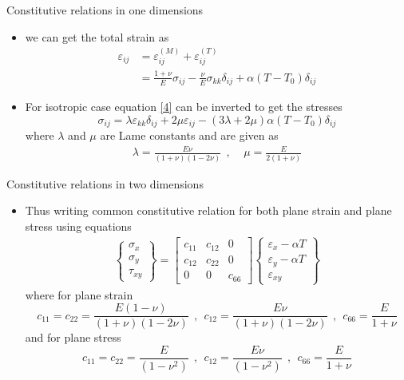 \documentclass{beamer}
\begin{document}
\begin{frame}[t,fragile]{Constitutive relations in one dimensions}
    \begin{itemize}
        \item we can get the total strain as 
\begin{align}
    \varepsilon_{ij}&=\varepsilon_{ij}^{(M)}+\varepsilon_{ij}^{(T)}\nonumber \\
    &=\frac{1+\nu}{E}\sigma_{ij}-\frac{\nu}{E}\sigma_{kk}\delta_{ij}+\alpha(T-T_0)\delta_{ij}
\end{align}
      \item  For isotropic case equation \ref{4} can be inverted to get the stresses 
\begin{equation}
    \sigma_{ij}=\lambda\varepsilon_{kk}\delta_{ij}+2\mu\varepsilon_{ij}-(3\lambda+2\mu)\alpha(T-T_0)\delta_{ij}
\end{equation}
where $\lambda$ and $\mu$ are Lame constants and are given as 
\begin{align}\lambda=\frac{E\nu}{(1+\nu)(1-2\nu)}~ ~,~ ~ ~ ~ ~\mu=\frac{E}{2(1+\nu)}\end{align}
    \end{itemize}
\end{frame}
\begin{frame}[t,fragile]{Constitutive relations in two dimensions}
    \begin{itemize}
        \item Thus writing common constitutive relation for both plane strain and plane stress using equations   
\begin{align}
\begin{Bmatrix}
    \sigma_x\\ \sigma_y\\ \tau_{xy}   
\end{Bmatrix}=
\begin{bmatrix}
    c_{11}&c_{12}&0\\c_{12}&c_{22}&0\\0&0&c_{66}
\end{bmatrix}
\begin{Bmatrix}
    \varepsilon_x-\alpha T\\ \varepsilon_y-\alpha T\\ \varepsilon_{xy}
\end{Bmatrix} 
\end{align}
where for plane strain 
$$c_{11}=c_{22}=\frac{E(1-\nu)}{(1+\nu)(1-2\nu)}~ ~ ,~ ~ c_{12}=\frac{E\nu}{(1+\nu)(1-2\nu)}~ ~,~  ~ c_{66}=\frac{E}{1+\nu}$$
and for plane stress 
$$c_{11}=c_{22}=\frac{E}{(1-\nu^2)}~ ~ ,~ ~ c_{12}=\frac{E\nu}{(1-\nu^2)}~ ~,~  ~ c_{66}=\frac{E}{1+\nu}$$
    \end{itemize}
\end{frame}
\end{document}
